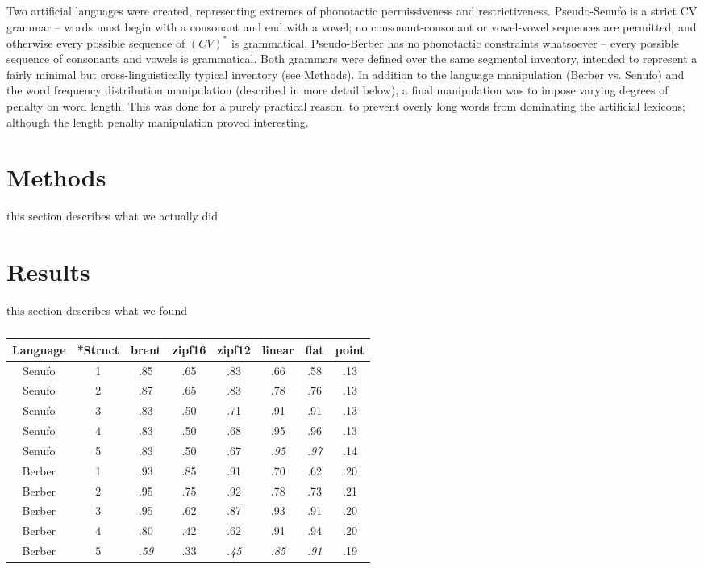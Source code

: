 \documentclass[11pt]{article}
\begin{document}
Two artificial languages were created, representing extremes of phonotactic permissiveness and restrictiveness. Pseudo-Senufo is a strict CV grammar -- words must begin with a consonant and end with a vowel; no consonant-consonant or vowel-vowel sequences are permitted; and otherwise every possible sequence of $(CV)^*$ is grammatical. Pseudo-Berber has no phonotactic constraints whatsoever -- every possible sequence of consonants and vowels is grammatical. Both grammars were defined over the same segmental inventory, intended to represent a fairly minimal but cross-linguistically typical inventory (see Methods). In addition to the language manipulation (Berber vs. Senufo) and the word frequency distribution manipulation (described in more detail below), a final manipulation was to impose varying degrees of penalty on word length. This was done for a purely practical reason, to prevent overly long words from dominating the artificial lexicons; although the length penalty manipulation proved interesting.

\section{Methods}

this section describes what we actually did

\section{Results}

this section describes what we found
\begin{table*}[t!]
\begin{center}
\begin{tabular}{|c||c|cccccc|}
  \hline
  Language & *Struct & brent & zipf16 & zipf12 & linear & flat & point \\
  \hline
  Senufo & 1 & .85 & .65 & .83 & .66 & .58 & .13 \\
  Senufo & 2 & .87 & .65 & .83 & .78 & .76 & .13 \\
  Senufo & 3 & .83 & .50 & .71 & .91 & .91 & .13 \\
  Senufo & 4 & .83 & .50 & .68 & .95 & .96 & .13 \\
  Senufo & 5 & .83 & .50 & .67 & \textit{.95} & \textit{.97} & .14 \\
  \hline
  Berber & 1 & .93 & .85 & .91 & .70 & .62 & .20 \\
  Berber & 2 & .95 & .75 & .92 & .78 & .73 & .21 \\
  Berber & 3 & .95 & .62 & .87 & .93 & .91 & .20 \\
  Berber & 4 & .80 & .42 & .62 & .91 & .94 & .20 \\
  Berber & 5 & \textit{.59} & .33 & \textit{.45} & \textit{.85} & \textit{.91} & .19 \\
  \hline
\end{tabular}
\end{center}
\caption{\label{Results.}}
\end{table*}
\end{document}
